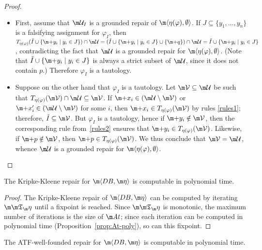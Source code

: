 \begin{proof}
  \begin{itemize}
  \item First, assume that $\UU_I$ is a grounded repair of $\dbhere$.
    If $J\subseteq\{y_1,\ldots,y_n\}$ is a falsifying assignment for $\varphi_I$, then $T_{\eta(\varphi)}(\check I\cup\{\add y_i\mid y_i\in J\})\cap\UU=(\check I\cup\{\add y_i\mid y_i\in J\}\cup\{\add q\})\cap\UU=\check I\cup\{\add y_i\mid y_i\in J\}$, contradicting the fact that $\UU$ is a grounded repair for $\dbhere$.
    (Note that $\check I\cup\{\add y_i\mid y_i\in J\}$ is always a strict subset of $\UU$, since it does not contain $p$.)
    Therefore $\varphi_I$ is a tautology.
  \item Suppose on the other hand that $\varphi_I$ is a tautology.
    Let $\VV\subseteq\UU$ be such that $T_{\eta(\varphi)}(\VV)\cap\UU\subseteq\VV$.
    If $\add x_i\in(\UU\setminus\VV)$ or  $\add x_i'\in(\UU\setminus\VV)$ for some $i$, then $\add x_i\in T_{\eta(\varphi)}(\VV)$ by rules \ref{rules1}; therefore, $\check I\subseteq\VV$.
    But $\varphi_I$ is a tautology, hence if $\add y_i\notin\VV$, then the corresponding rule from~\ref{rules2} ensures that $\add y_i\in T_{\eta(\varphi)}(\VV)$. Likewise, if $\add p\notin\VV$, then $\add p\in T_{\eta(\varphi)}(\VV)$.
    We thus conclude that $\VV=\UU$, whence $\UU$ is a grounded repair for $\dbhere$.\qedhere
  \end{itemize}
\end{proof}

\begin{proposition}
  The Kripke-Kleene repair for $\fulldb$ is computable in polynomial time.
  \label{prop:KK-poly}
\end{proposition}
\begin{proof}
  The Kripke-Kleene repair of $\fulldb$ can be computed by iterating $\Ap$ until a fixpoint is reached.
  Since $\Ap$ is monotonic, the maximum number of iterations is the size of $\atoms$; since each iteration can be computed in polynomial time (Proposition~\ref{prop:At-poly}), so can this fixpoint.
\end{proof}

\begin{proposition}\label{prop:compl:wf}
  The ATF-well-founded repair for $\fulldb$ is computable in polynomial time.
\end{proposition}

